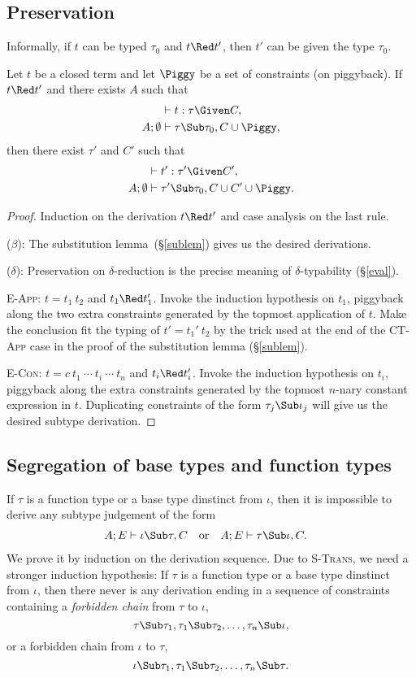 \documentclass{amsart}
\theoremstyle{definition}
\begin{document}
\subsection{Preservation}
\label{preservation}

Informally, if $t$ can be typed $\tau_0$ and $t\Red t'$,
then $t'$ can be given the type $\tau_0$.

Let $t$ be a closed term and let $\Piggy$ be a set of constraints
(on piggyback). If $t\Red t'$ and there exists $A$ such that
\begin{align*}
&\vdash t:\tau \Given C,\\
A;\emptyset&\vdash \tau\Sub\tau_0,C\cup\Piggy,
\end{align*}
then there exist $\tau'$ and $C'$ such that
\begin{align*}
&\vdash t':\tau'\Given C',\\
A;\emptyset&\vdash \tau'\Sub\tau_0,C\cup C'\cup\Piggy.
\end{align*}

\begin{proof}
Induction on the derivation $t\Red t'$ and case analysis on the
last rule.

\Case($\beta$): The substitution lemma~(\S\ref{sublem}) gives us
the desired derivations.

\Case($\delta$): Preservation on $\delta$-reduction is the
precise meaning of $\delta$-typability (\S\ref{eval}).

\Case\textsc{E-App}: $t=t_1~t_2$ and $t_1\Red t_1'$. Invoke the
induction hypothesis on $t_1$, piggyback along the two extra
constraints generated by the topmost application of $t$. Make
the conclusion fit the typing of $t'=t_1'~t_2$ by the trick used
at the end of the \textsc{CT-App} case in the proof of the
substitution lemma (\S\ref{sublem}).

\Case\textsc{E-Con}: $t=c~t_1~\cdots~t_i~\cdots~t_n$ and $t_i\Red
t_i'$. Invoke the induction hypothesis on $t_i$, piggyback along
the extra constraints generated by the topmost $n$-nary constant
expression in $t$. Duplicating constraints of the form
$\tau_j\Sub\iota_j$ will give us the desired subtype derivation.
\end{proof}

\subsection{Segregation of base types and function types}
\label{segre-types}
If $\tau$ is a function type or a base type dinstinct from $\iota$,
then it is impossible to derive any subtype judgement of the form
\begin{align*}
A;E&\vdash \iota\Sub\tau,C&
&\mbox{or}&
A;E&\vdash\tau\Sub\iota,C.
\end{align*}
We prove it by induction on the derivation sequence. Due to
\textsc{S-Trans}, we need a stronger induction hypothesis: If
$\tau$ is a function type or a base type dinstinct from $\iota$,
then there never is any derivation ending in a sequence of
constraints containing a \emph{forbidden chain} from $\tau$ to
$\iota$,
\[
\tau\Sub\tau_1,\tau_1\Sub\tau_2,\ldots,\tau_n\Sub\iota,
\]
or a forbidden chain from $\iota$ to $\tau$,
\[
\iota\Sub\tau_1,\tau_1\Sub\tau_2,\ldots,\tau_n\Sub\tau.
\]
\end{document}
